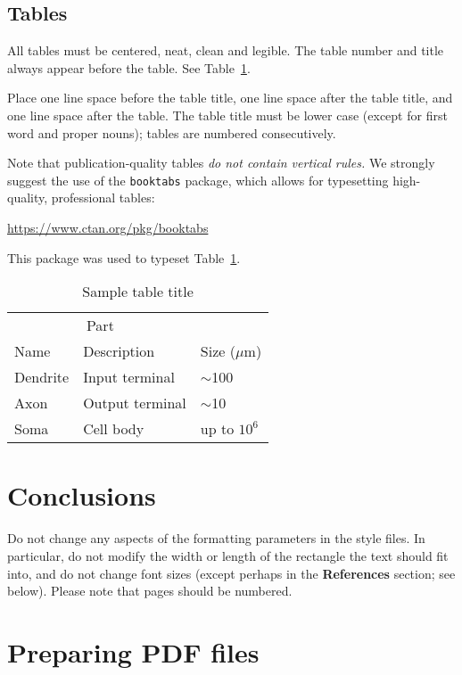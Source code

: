 \documentclass{article}
\begin{document}
\subsection{Tables}

All tables must be centered, neat, clean and legible.  The table
number and title always appear before the table.  See
Table~\ref{sample-table}.

Place one line space before the table title, one line space after the
table title, and one line space after the table. The table title must
be lower case (except for first word and proper nouns); tables are
numbered consecutively.

Note that publication-quality tables \emph{do not contain vertical
  rules.} We strongly suggest the use of the \verb+booktabs+ package,
which allows for typesetting high-quality, professional tables:
\begin{center}
  \url{https://www.ctan.org/pkg/booktabs}
\end{center}
This package was used to typeset Table~\ref{sample-table}.

\begin{table}[t]
  \caption{Sample table title}
  \label{sample-table}
  \centering
  \begin{tabular}{lll}
    \toprule
    \multicolumn{2}{c}{Part}                   \\
    \cmidrule{1-2}
    Name     & Description     & Size ($\mu$m) \\
    \midrule
    Dendrite & Input terminal  & $\sim$100     \\
    Axon     & Output terminal & $\sim$10      \\
    Soma     & Cell body       & up to $10^6$  \\
    \bottomrule
  \end{tabular}
\end{table}

\section{Conclusions}

Do not change any aspects of the formatting parameters in the style
files.  In particular, do not modify the width or length of the
rectangle the text should fit into, and do not change font sizes
(except perhaps in the \textbf{References} section; see below). Please
note that pages should be numbered.

\section{Preparing PDF files}
\end{document}
